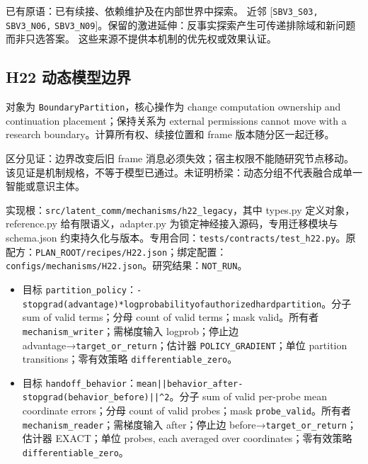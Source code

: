 \documentclass[
  10pt,
]{article}
\begin{document}
已有原语：已有续接、依赖维护及在内部世界中探索。 近邻
{[}\nolinkurl{SBV3_S03,} \nolinkurl{SBV3_N06,}
\nolinkurl{SBV3_N09}{]}。保留的激进延伸：反事实探索产生可传递排除域和新问题而非只选答案。
这些来源不提供本机制的优先权或效果认证。

\subsection{H22
动态模型边界}\label{h22-ux52a8ux6001ux6a21ux578bux8fb9ux754c}

对象为 \nolinkurl{BoundaryPartition}，核心操作为 change computation
ownership and continuation placement；保持关系为 external permissions
cannot move with a research boundary。计算所有权、续接位置和 frame
版本随分区一起迁移。

区分见证：边界改变后旧 frame 消息必须失效；宿主权限不能随研究节点移动。
该见证是机制规格，不等于模型已通过。未证明桥梁：动态分组不代表融合成单一智能或意识主体。

实现根：{\small\nolinkurl{src/latent_comm/mechanisms/h22_legacy}}，其中
types.py 定义对象，reference.py 给有限语义，adapter.py
为锁定神经接入源码，专用迁移模块与 schema.json
约束持久化与版本。专用合同：{\small\nolinkurl{tests/contracts/test_h22.py}}。原配方：{\small\nolinkurl{PLAN_ROOT/recipes/H22.json}}；绑定配置：{\small\nolinkurl{configs/mechanisms/H22.json}}。研究结果：\nolinkurl{NOT_RUN}。

\begin{itemize}
\item
  目标
  \nolinkurl{partition_policy}：{\small\nolinkurl{-stopgrad(advantage)*log}\hspace{0.333em}\nolinkurl{probability}\hspace{0.333em}\nolinkurl{of}\hspace{0.333em}\nolinkurl{authorized}\hspace{0.333em}\nolinkurl{hard}\hspace{0.333em}\nolinkurl{partition}}。分子
  sum of valid terms；分母 count of valid terms；mask valid。所有者
  \nolinkurl{mechanism_writer}；需梯度输入 logprob；停止边
  advantage→\nolinkurl{target_or_return}；估计器
  \nolinkurl{POLICY_GRADIENT}；单位 partition transitions；零有效策略
  \nolinkurl{differentiable_zero}。
\item
  目标
  \nolinkurl{handoff_behavior}：{\small\nolinkurl{mean}\hspace{0.333em}\nolinkurl{||behavior_after}\hspace{0.333em}\nolinkurl{-}\hspace{0.333em}\nolinkurl{stopgrad(behavior_before)||^2}}。分子
  sum of valid per-probe mean coordinate errors；分母 count of valid
  probes；mask \nolinkurl{probe_valid}。所有者
  \nolinkurl{mechanism_reader}；需梯度输入 after；停止边
  before→\nolinkurl{target_or_return}；估计器 EXACT；单位 probes, each
  averaged over coordinates；零有效策略
  \nolinkurl{differentiable_zero}。
\end{itemize}
\end{document}
